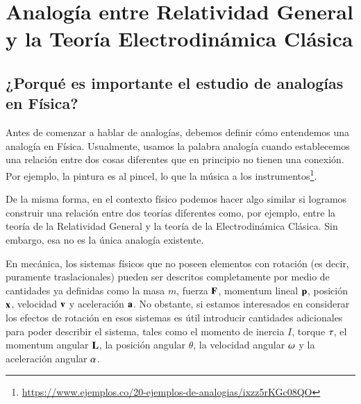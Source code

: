 \chapter{Analogía entre Relatividad General y la Teoría Electrodinámica Clásica}
\label{cap:3}
\newpage

\section{¿Porqué es importante el estudio de analogías en Física?}
\label{sec:4}


Antes de comenzar a hablar de analogías, debemos definir cómo entendemos una analogía en Física. Usualmente, usamos la palabra analogía cuando establecemos una relación entre dos cosas diferentes que en principio no tienen una conexión. Por ejemplo, la pintura es al pincel, lo que la música a los instrumentos\footnote{\url{https://www.ejemplos.co/20-ejemplos-de-analogias/ixzz5rKGc08QO}}.

De la misma forma, en el contexto físico podemos hacer algo similar si logramos construir una relación entre dos teorías diferentes como, por ejemplo, entre la teoría de la Relatividad General y la teoría de la Electrodinámica Clásica. Sin embargo, esa no es la única analogía existente.


En mecánica, los sistemas físicos que no poseen elementos con rotación (es decir, puramente traslacionales) pueden ser descritos completamente por medio de cantidades ya definidas como la masa $m$, fuerza $\vb{F}$, momentum lineal $\vb{p}$, posición $\vb{x}$, velocidad $\vb{v}$ y aceleración $\vb{a}$. No obstante, si estamos interesados en considerar los efectos de rotación en esos sistemas es útil introducir cantidades adicionales para poder describir el sistema, tales como el momento de inercia $I$, torque $\vb{\tau}$, el momentum angular $\vb{L}$, la posición angular $\theta$, la velocidad angular $\vb{\omega}$ y la aceleración angular $\vb{\alpha}$.

